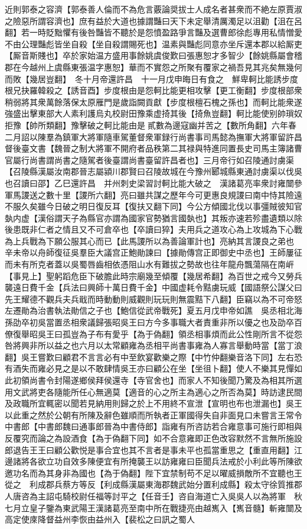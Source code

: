 近則郭泰之容濟【郭泰善人倫而不為危言覈論奨拔士人成名者甚衆而不絶左原賈淑之險惡所謂容濟也】庶有益於大道也據謂豔曰天下未定舉清厲濁足以沮勸【沮在呂翻】若一時貶黜懼有後咎豔皆不聽於是怨憤盈路爭言豔及選曹郎徐彪專用私情憎愛不由公理豔彪皆坐自殺【坐自殺謂賜死也】温素與豔彪同意亦坐斥還本郡以給厮吏【厮音斯賤也】卒於家始温方盛用事餘姚虞俊歎曰張惠恕才多智少【餘姚縣屬會稽郡在今越州上虞縣東張温字惠恕】華而不實怨之所聚有覆家之禍吾見其兆矣無幾何而敗【幾居豈翻】　冬十月帝還許昌　十一月戊申晦日有食之　鮮卑軻比能誘步度根兄抉羅韓殺之【誘音酉】步度根由是怨軻比能更相攻擊【更工衡翻】步度根部衆稍弱將其衆萬餘落保太原雁門是歲詣闕貢獻【步度根檀石槐之孫也】而軻比能衆遂強盛出擊東部大人素利護烏丸校尉田豫乘虚掎其後【掎魚豈翻】軻比能使别帥瑣奴拒豫【帥所類翻】豫擊破之軻比能由是貳數為邊寇幽并苦之【數所角翻】六年春二月詔以陳羣為鎮軍大將軍隨車駕董督衆軍録行尚書事司馬懿為撫軍大將軍留許昌督後臺文書【魏晉之制大將軍不開府者品秩第二其禄與特進同置長史司馬主簿諸曹官屬行尚書謂尚書之隨駕者後臺謂尚書臺留許昌者也】三月帝行如召陵通討虜渠【召陵縣漢屬汝南郡晉志屬潁川郡賢曰召陵故城在今豫州郾城縣東通討虜渠以伐吳也召讀曰邵】乙巳還許昌　并州刺史梁習討軻比能大破之　漢諸葛亮率衆討雍闓參軍馬謖送之數十里【謖所六翻】亮曰雖共謀之歷年今可更惠良規謖曰南中恃其險遠不服久矣雖今日破之明日復反耳【復扶又翻下同】今公方傾國北伐以事彊賊彼知官埶内虚【漢俗謂天子為縣官亦謂為國家官勢猶言國埶也】其叛亦速若殄盡遺類以除後患既非仁者之情且又不可倉卒也【卒讀曰猝】夫用兵之道攻心為上攻城為下心戰為上兵戰為下願公服其心而已【此馬謖所以為善論軍計也】亮納其言謖良之弟也　辛未帝以舟師復征吳羣臣大議宫正鮑勛諫曰【據勛傳宫正即御史中丞也】王師屢征而未有所克者蓋以吳蜀唇齒相依憑阻山水有難拔之勢故也往年龍舟飄蕩隔在南㟁【事見上】聖躬蹈危臣下破膽此時宗廟幾至傾覆【幾居希翻】為百世之戒今又勞兵襲遠日費千金【兵法曰興師十萬日費千金】中國虚耗令黠虜玩威【國語祭公謀父曰先王耀德不觀兵夫兵戢而時動動則威觀則玩玩則無震黠下八翻】臣竊以為不可帝怒左遷勛為治書執法勛信之子也【鮑信從武帝戰死】夏五月戊申帝如譙　吳丞相北海孫劭卒初吳當置丞相衆議歸張昭吳王曰方今多事職大者責重非所以優之也及劭卒百僚復舉昭吳王曰孤豈為子布有愛乎【為于偽翻】領丞相事煩而此公性剛所言不從怨咎將興非所以益之也六月以太常顧雍為丞相平尚書事雍為人寡言舉動時當【當丁浪翻】吳王嘗歎曰顧君不言言必有中至飲宴歡樂之際【中竹仲翻樂音洛下同】左右恐有酒失而雍必見之是以不敢肆情吳王亦曰顧公在坐【坐徂卜翻】使人不樂其見憚如此初領尚書令封陽遂鄉侯拜侯還寺【寺官舍也】而家人不知後聞乃驚及為相其所選用文武將吏各隨能所任心無適莫【適音的心之所主為適心之所否為莫】時訪逮民間及政職所宜輒密以聞若見納用則歸之於上不用終不宣泄【宣明也布也泄漏也】吳王以此重之然於公朝有所陳及辭色雖順而所執者正軍國得失自非面見口未嘗言王常令中書郎【中書郎魏曰通事郎晉為中書侍郎】詣雍有所咨訪若合雍意事可施行即相與反覆究而論之為設酒食【為于偽翻下同】如不合意雍即正色改容默然不言無所施設郎退告王王曰顧公歡悦是事合宜也其不言者是事未平也孤當重思之【重直用翻】江邊諸將各欲立功自效多陳便宜有所掩襲王以訪雍雍曰臣聞兵法戒於小利此等所陳欲邀功名而為其身非為國也【為于偽翻】陛下宜禁制苟不足以曜威損敵所不宜聽也王從之　利成郡兵蔡方等反【利成縣漢屬東海郡魏武始分置利成縣】殺太守徐質推郡人唐咨為主詔屯騎校尉任福等討平之【任音壬】咨自海道亡入吳吳人以為將軍　秋七月立皇子鑒為東武陽王漢諸葛亮至南中所在戰捷亮由越嶲入【嶲音髓】斬雍闓及高定使庲降督益州李恢由益州入【裴松之曰訊之蜀人